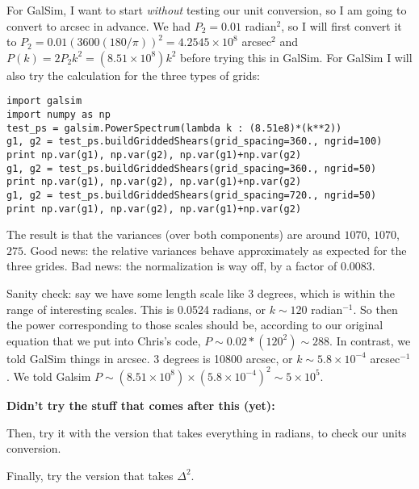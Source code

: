 \documentclass[preprint]{aastex}
\begin{document}
For GalSim, I want to start {\em without} testing our unit conversion,
so I am going to convert to arcsec in advance.  We had $P_2=0.01$
radian$^2$, so I will first convert it to
$P_2=0.01 (3600(180/\pi))^2=4.2545\times 10^8$ arcsec$^2$ and $P(k)=2
P_2 k^2 = (8.51\times 10^{8}) k^2$ before trying this in
GalSim.  For GalSim I will also try the calculation for the three
types of grids:
\begin{verbatim}
import galsim
import numpy as np
test_ps = galsim.PowerSpectrum(lambda k : (8.51e8)*(k**2))
g1, g2 = test_ps.buildGriddedShears(grid_spacing=360., ngrid=100)
print np.var(g1), np.var(g2), np.var(g1)+np.var(g2)
g1, g2 = test_ps.buildGriddedShears(grid_spacing=360., ngrid=50)
print np.var(g1), np.var(g2), np.var(g1)+np.var(g2)
g1, g2 = test_ps.buildGriddedShears(grid_spacing=720., ngrid=50)
print np.var(g1), np.var(g2), np.var(g1)+np.var(g2)
\end{verbatim}
The result is that the variances (over both components) are around
$1070$, $1070$, $275$.  Good news: the relative variances behave
approximately as expected for the three grides.  Bad news: the
normalization is way off, by a factor of $0.0083$.

Sanity check: say we have some length scale like 3 degrees, which is
within the range of interesting scales.  This is 0.0524 radians, or
$k\sim120$ radian$^{-1}$.  So
then the power corresponding to those scales should be, according to
our original equation that we put into Chris's code, $P\sim
0.02*(120^2)\sim 288$.  In contrast, we told GalSim things in arcsec.
3 degrees is 10800 arcsec, or $k\sim 5.8\times 10^{-4}$ arcsec$^{-1}$.
We told Galsim $P\sim (8.51\times 10^8)\times (5.8\times
10^{-4})^2\sim 5\times 10^5$.  

\textbf{Didn't try the stuff that comes after this (yet):}

Then, try it with the version that takes everything in radians, to
check our units conversion.

Finally, try the version that takes $\Delta^2$.
\end{document}
